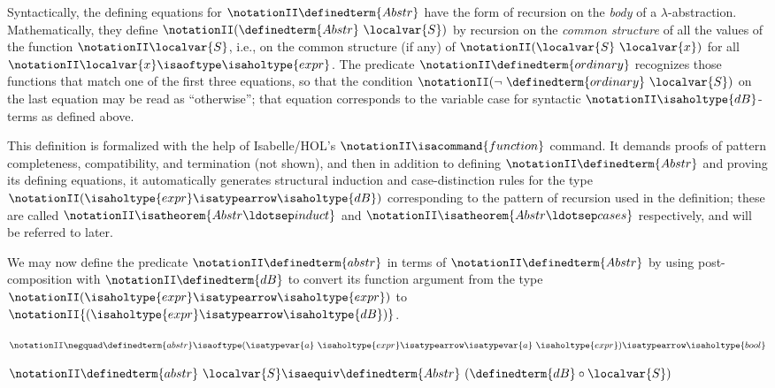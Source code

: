 \documentclass[copyright,creativecommons]{eptcs}
\begin{document}
Syntactically, the defining equations for \(\notationII \definedterm{Abstr}\) have the form of
recursion on the \emph{body} of a \hbox{$\lambda$-abstraction}.
Mathematically, they define \(\notationII  (\definedterm{Abstr}\ \localvar{S}) \) by recursion on the
\emph{common structure} of all the values of the function \(\notationII \localvar{S}\), i.e.,
on the common structure (if any) of \(\notationII  (\localvar{S}\ \localvar{x}) \) for all \(\notationII  \localvar{x} \isaoftype \isaholtype{expr} \).
The predicate \(\notationII \definedterm{ordinary}\) recognizes those functions that match one of
the first three equations, so that the condition \(\notationII  ( \neg\ \definedterm{ordinary}\ \localvar{S}) \)
on the last equation may be read as ``otherwise''; that equation corresponds
to the variable case for syntactic \(\notationII \isaholtype{dB}\)-terms as defined above.

This definition is formalized with the help of Isabelle\slash HOL's
\(\notationII \isacommand{function}\) command.  It demands proofs of pattern completeness,
compatibility, and termination (not shown), and then in addition to
defining \(\notationII \definedterm{Abstr}\) and proving its defining equations, it automatically
generates structural induction and case-distinction rules for the type
\(\notationII  (\isaholtype{expr} \isatypearrow \isaholtype{dB}) \) corresponding to the pattern of recursion used
in the definition; these are called \(\notationII  \isatheorem{Abstr\ldotsep induct} \) and
\(\notationII  \isatheorem{Abstr\ldotsep cases} \) respectively, and will be referred to
later.

We may now define the predicate \(\notationII \definedterm{abstr}\) in terms of \(\notationII \definedterm{Abstr}\) by
using post-\break composition with \(\notationII \definedterm{dB}\) to convert its function argument
from the type \(\notationII  (\isaholtype{expr} \isatypearrow \isaholtype{expr}) \) to \(\notationII { (\isaholtype{expr} \isatypearrow \isaholtype{dB}) }\).

\begin{Defn}
\label{defn:hybrid-abstr} \formal
\(\notationII  \negquad \definedterm{abstr} \isaoftype (\isatypevar{a}\ \isaholtype{expr} \isatypearrow \isatypevar{a}\ \isaholtype{expr}) \isatypearrow \isaholtype{bool} \)\par\nopagebreak
\(\notationII  \definedterm{abstr}\ \localvar{S} \isaequiv \definedterm{Abstr}\ (\definedterm{dB} \circ \localvar{S}) \)
\end{Defn}
\end{document}
